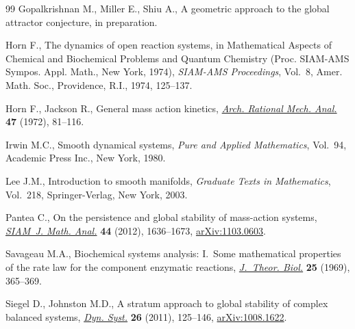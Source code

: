\documentclass[pdftex]{sigma}
\begin{document}
\begin{thebibliography}{99}
Gopalkrishnan M., Miller E., Shiu A., A geometric approach to the global
  attractor conjecture, in preparation.

Horn F., The dynamics of open reaction systems, in Mathematical Aspects of
  Chemical and Biochemical Problems and Quantum Chemistry ({P}roc. {SIAM}-{AMS}
  {S}ympos. {A}ppl. {M}ath., {N}ew {Y}ork, 1974), \textit{SIAM-AMS
  Proceedings}, Vol.~8, Amer. Math. Soc., Providence, R.I., 1974, 125--137.

Horn F., Jackson R., General mass action kinetics, \href{http://dx.doi.org/10.1007/BF00251225}{\textit{Arch. Rational Mech.
  Anal.}} \textbf{47} (1972), 81--116.

Irwin M.C., Smooth dynamical systems, \textit{Pure and Applied Mathematics},
  Vol.~94, Academic Press Inc., New York, 1980.

Lee J.M., Introduction to smooth manifolds, \textit{Graduate Texts in
  Mathematics}, Vol.~218, Springer-Verlag, New York, 2003.

Pantea C., On the persistence and global stability of mass-action systems,
  \href{http://dx.doi.org/10.1137/110840509}{\textit{SIAM~J. Math. Anal.}} \textbf{44} (2012), 1636--1673,
  \href{http://arxiv.org/abs/1103.0603}{arXiv:1103.0603}.

Savageau M.A., Biochemical systems analysis: I.~Some mathematical properties of
  the rate law for the component enzymatic reactions, \href{http://dx.doi.org/10.1016/S0022-5193(69)80026-3}{\textit{J.~Theor. Biol.}}
  \textbf{25} (1969), 365--369.

Siegel D., Johnston M.D., A stratum approach to global stability of complex
  balanced systems, \href{http://dx.doi.org/10.1080/14689367.2010.545812}{\textit{Dyn. Syst.}} \textbf{26} (2011), 125--146,
  \href{http://arxiv.org/abs/1008.1622}{arXiv:1008.1622}.

\end{thebibliography}\LastPageEnding
\end{document}
